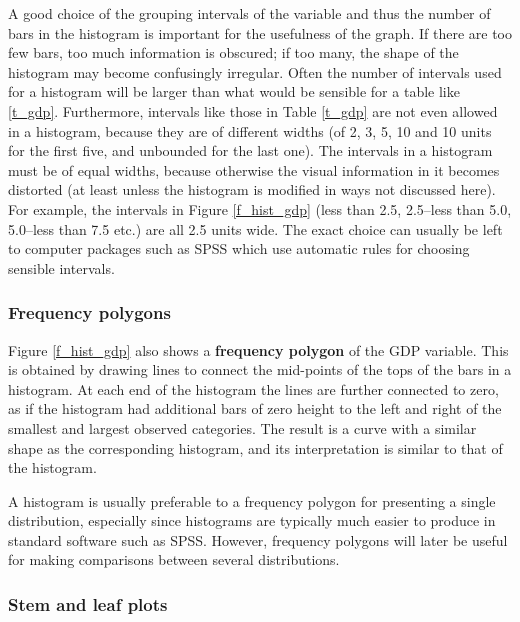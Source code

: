 A good choice of the grouping intervals of the variable and thus the
number of bars in the histogram is important for the usefulness of the
graph. If there are too few bars, too much information is obscured; if
too many, the shape of the histogram may become confusingly irregular.
Often the number of intervals used for a histogram will be larger than
what would be sensible for a table like \ref{t_gdp}. Furthermore,
intervals like those in Table \ref{t_gdp} are not even allowed in a
histogram, because they are of different widths (of 2, 3, 5, 10 and 10
units for the first five, and unbounded for the last one). The intervals
in a histogram must be of equal widths, because otherwise the visual
information in it becomes distorted (at least unless the histogram is
modified in ways not discussed here). For example, the intervals in
Figure \ref{f_hist_gdp} (less than 2.5, 2.5--less than 5.0, 5.0--less
than 7.5 etc.) are all 2.5 units wide. The exact choice
can usually be left to computer packages such as SPSS which use
automatic rules for choosing sensible intervals.

\subsubsection{Frequency polygons}

Figure \ref{f_hist_gdp} also shows a \textbf{frequency polygon} of the
GDP variable. This is obtained by drawing lines to connect the
mid-points of the tops of the bars in a histogram. At each end of the
histogram the lines are further connected to zero, as if the histogram
had additional bars of zero height to the left and right of the smallest
and largest observed categories. The result is a curve with a similar
shape as the corresponding histogram, and its interpretation is similar
to that of the histogram.

A histogram is usually preferable to a frequency polygon for presenting
a single distribution, especially since histograms are typically much
easier to produce in standard software such as SPSS. However, frequency
polygons will later be useful for making comparisons between several
distributions.

\subsubsection{Stem and leaf plots}

